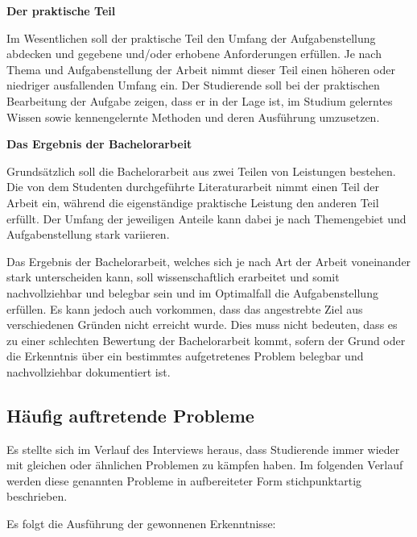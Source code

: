 \documentclass[bibliography=totoc,listof=totoc,BCOR=5mm,DIV=12,oneside]{scrbook}
\begin{document}
\newpage
\par \bigskip \textbf{Der praktische Teil}
\par Im Wesentlichen soll der praktische Teil den Umfang der Aufgabenstellung abdecken und gegebene und/oder erhobene Anforderungen erfüllen. Je nach Thema und Aufgabenstellung der Arbeit nimmt dieser Teil einen höheren oder niedriger ausfallenden Umfang ein.
Der Studierende soll bei der praktischen Bearbeitung der Aufgabe zeigen, dass er in der Lage ist, im Studium gelerntes Wissen sowie kennengelernte Methoden und deren Ausführung umzusetzen. 
\par \bigskip \textbf{Das Ergebnis der Bachelorarbeit}
\par Grundsätzlich soll die Bachelorarbeit aus zwei Teilen von Leistungen bestehen. Die von dem Studenten durchgeführte Literaturarbeit nimmt einen Teil der Arbeit ein, während die eigenständige praktische Leistung den anderen Teil erfüllt. Der Umfang der jeweiligen Anteile kann dabei je nach Themengebiet und Aufgabenstellung stark variieren.
\par Das Ergebnis der Bachelorarbeit, welches sich je nach Art der Arbeit voneinander stark unterscheiden kann, soll wissenschaftlich erarbeitet und somit nachvollziehbar und belegbar sein und im Optimalfall die Aufgabenstellung erfüllen. Es kann jedoch auch vorkommen, dass das angestrebte Ziel aus verschiedenen Gründen nicht erreicht wurde. Dies muss nicht bedeuten, dass es zu einer schlechten Bewertung der Bachelorarbeit kommt, sofern der Grund oder die Erkenntnis über ein bestimmtes aufgetretenes Problem belegbar und nachvollziehbar dokumentiert ist.

\newpage
\subsection{Häufig auftretende Probleme}
\par Es stellte sich im Verlauf des Interviews heraus, dass Studierende immer wieder mit gleichen oder ähnlichen Problemen zu kämpfen haben. Im folgenden Verlauf werden diese genannten Probleme in aufbereiteter Form stichpunktartig beschrieben.

\par \medskip Es folgt die Ausführung der gewonnenen Erkenntnisse:
\end{document}
